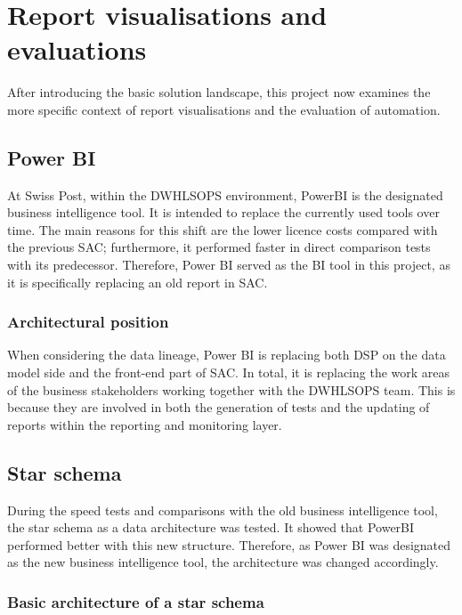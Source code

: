 \section{Report visualisations and evaluations}

After introducing the basic solution landscape, this project now examines the more specific context of report visualisations and the evaluation of automation.



\subsection*{Power BI}

At Swiss Post, within the \gls{DWHLSOPS} environment, \gls{PowerBI} is the designated business intelligence tool. It is intended to replace the currently used tools over time. The main reasons for this shift are the lower licence costs compared with the previous \gls{SAC}; furthermore, it performed faster in direct comparison tests with its predecessor. Therefore, Power BI served as the BI tool in this project, as it is specifically replacing an old report in \gls{SAC}.



\subsubsection*{Architectural position}

When considering the data lineage, Power BI is replacing both \gls{DSP} on the data model side and the front-end part of \gls{SAC}. In total, it is replacing the work areas of the business stakeholders working together with the \gls{DWHLSOPS} team. This is because they are involved in both the generation of tests and the updating of reports within the reporting and monitoring layer.



\subsection*{Star schema}

During the speed tests and comparisons with the old business intelligence tool, the star schema as a data architecture was tested. It showed that \gls{PowerBI} performed better with this new structure. Therefore, as Power BI was designated as the new business intelligence tool, the architecture was changed accordingly.

\subsubsection*{Basic architecture of a star schema}

